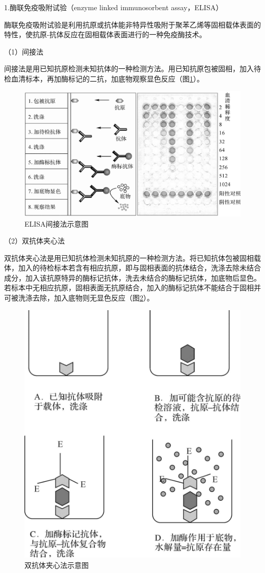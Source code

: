1.酶联免疫吸附试验（enzyme linked immunosorbent assay，ELISA）

酶联免疫吸附试验是利用抗原或抗体能非特异性吸附于聚苯乙烯等固相载体表面的特性，使抗原-抗体反应在固相载体表面进行的一种免疫酶技术。

（1）间接法

间接法是用已知抗原检测未知抗体的一种检测方法。用已知抗原包被固相，加入待检血清标本，再加酶标记的二抗，加底物观察显色反应（图\ref{fig10-16}）。

\begin{figure}[!htbp]
 \centering
 \includegraphics[width=.6\textwidth]{./images/Image00168.jpg}
 \captionsetup{justification=centering}
 \caption{ELISA间接法示意图}
 \label{fig10-16}
  \end{figure} 

（2）双抗体夹心法

双抗体夹心法是用已知抗体检测未知抗原的一种检测方法。将已知抗体包被固相载体，加入的待检标本若含有相应抗原，即与固相表面的抗体结合，洗涤去除未结合成分，加入该抗原特异的酶标记抗体，洗去未结合的酶标记抗体，加底物后显色。若标本中无相应抗原，固相表面无抗原结合，加入的酶标记抗体不能结合于固相并可被洗涤去除，加入底物则无显色反应（图\ref{fig10-17}）。

\begin{figure}[!htbp]
 \centering
 \includegraphics[width=.5\textwidth]{./images/Image00169.jpg}
 \captionsetup{justification=centering}
 \caption{双抗体夹心法示意图}
 \label{fig10-17}
  \end{figure} 


